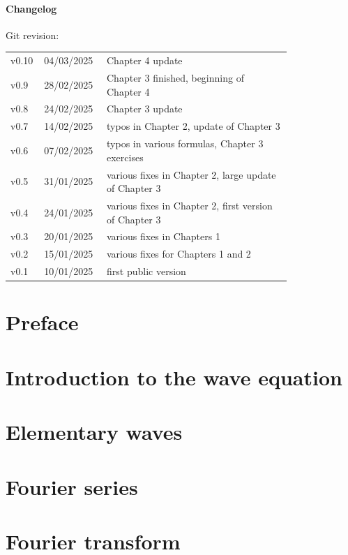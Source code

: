 \documentclass[a4paper,12pt]{book}
\theoremstyle{plain}
\theoremstyle{plain}
\theoremstyle{plain}
\theoremstyle{plain}
\theoremstyle{definition}
\theoremstyle{definition}
\begin{document}
{  \subsubsection*{Changelog}
  \scriptsize
  Git revision: \gitDescribe\vspace*{0.2cm}\\
  \begin{tabular}{@{} L{0.05\linewidth} L{0.15\linewidth} L{0.6\linewidth} @{}}
    \toprule
    v0.10 & 04/03/2025 & Chapter 4 update\\
    v0.9 & 28/02/2025 & Chapter 3 finished, beginning of Chapter 4\\
    v0.8 & 24/02/2025 & Chapter 3 update \\
    v0.7 & 14/02/2025 & typos in Chapter 2, update of Chapter 3\\
    v0.6 & 07/02/2025 & typos in various formulas, Chapter 3 exercises \\
    v0.5 & 31/01/2025 & various fixes in Chapter 2, large update of Chapter 3\\
    v0.4 & 24/01/2025 & various fixes in Chapter 2, first version of Chapter 3\\
    v0.3 & 20/01/2025 & various fixes in Chapters 1\\
    v0.2 & 15/01/2025 & various fixes for Chapters 1 and 2\\
    v0.1 & 10/01/2025 & first public version\\
    \bottomrule
  \end{tabular}
}

\tableofcontents
\glsaddallunused
\printglossary[title=Symbols and Notation]
\chapter*{Preface}

\mainmatter
\pagestyle{fancy}
\chapter{Introduction to the wave equation}
\label{chap:wave-eq}

\vfill\pagebreak

\shipoutAnswer
\chapter{Elementary waves}
\label{chap:elementary-waves}

\vfill\pagebreak

\shipoutAnswer
\chapter{Fourier series}
\label{chap:series}

\vfill\pagebreak

\shipoutAnswer
\vfill\pagebreak

\shipoutAnswer
\chapter{Fourier transform}

\label{chap:transform}
\end{document}
